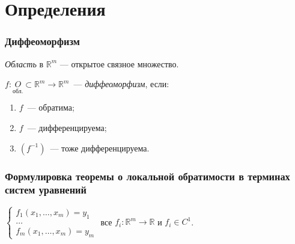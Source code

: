 \documentclass{article}
\begin{document}
\newcommand{\R}[0]{\mathbb{R}}
\newcommand{\RM}[0]{\mathbb{R}^m}
\newcommand{\dist}[0]{\mathrm{dist} $\ $}
\newcommand{\rang}[0]{\mathrm{rang} $\ $}
\newcommand{\grad}[0]{\mathrm{grad} $\ $}
\newcommand{\Lin}[0]{\mathrm{Lin} $\ $}

\tableofcontents

\newpage 

\part{Определения}

    \newpage

    \section{Диффеоморфизм}
    
        \textit{Область} в $\RM$ --- открытое связное множество.
        
        $f : \underset{\text{обл.}}{O} \subset \RM \rightarrow \RM$~--- \textit{диффеоморфизм}, если:
        
        \begin{enumerate}
        
            \item $f$~--- обратима;
            
            \item $f$~--- дифференцируема;
            
            \item $(f^{-1})$~--- тоже дифференцируема.
            
        \end{enumerate}
        
    \newpage
    
    \section{Формулировка теоремы о локальной обратимости в терминах систем уравнений}
    
    $
        \begin{cases}
            
            f_1(x_1, \ldots, x_m) = y_1 \\
                
            \ldots \\
                
            f_m(x_1, \ldots, x_m) = y_m
            
        \end{cases}
    $ все $f_i : \RM \rightarrow \R$ и $f_i \in C^1$.
        
\end{document}
